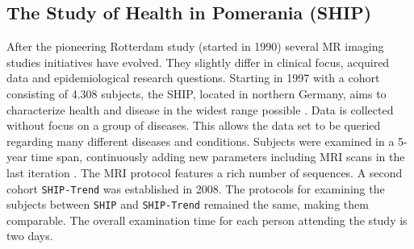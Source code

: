 \documentclass[journal]{style/vgtc} 			          %
\begin{document}
\subsection{The Study of Health in Pomerania (SHIP)}
After the pioneering Rotterdam study (started in 1990) several MR imaging studies initiatives have evolved.
%
They slightly differ in clinical focus, acquired data and epidemiological research questions.
%
Starting in 1997 with a cohort consisting of 4.308 subjects, the SHIP, located in northern Germany, aims to characterize health and disease in the widest range possible \cite{Volzke2011}.
%
Data is collected without focus on a group of diseases.
%
This allows the data set to be queried regarding many different diseases and conditions.
%
Subjects were examined in a 5-year time span, continuously adding new parameters including MRI scans in the last iteration \cite{Hegenscheid2009}.
%
The MRI protocol features a rich number of sequences.
%
%
A second cohort \texttt{SHIP-Trend} was established in 2008.
%
The protocols for examining the subjects between \texttt{SHIP} and \texttt{SHIP-Trend} remained the same, making them comparable.
%
The overall examination time for each person attending the study is two days.
\end{document}
